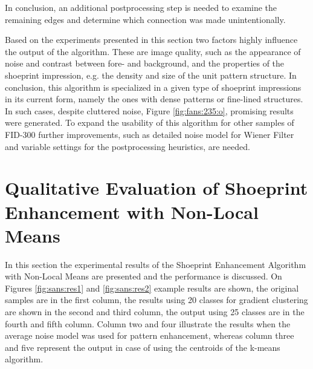 \documentclass[draft,final]{vutinfth} %
\begin{document}
In conclusion, an additional postprocessing step is needed to examine the remaining edges and determine which connection was made unintentionally.
\par
Based on the experiments presented in this section two factors highly influence the output of the algorithm.
These are image quality, such as the appearance of noise and contrast between fore- and background, and the properties of the shoeprint impression, e.g. the density and size of the unit pattern structure.
In conclusion, this algorithm is specialized in a given type of shoeprint impressions in its current form, namely the ones with dense patterns or fine-lined structures. 
In such cases, despite cluttered noise, Figure \ref{fig:fans:235:o}, promising results were generated.
To expand the usability of this algorithm for other samples of FID-300 further improvements, such as detailed noise model for Wiener Filter and variable settings for the postprocessing heuristics, are needed. 

\section{Qualitative Evaluation of Shoeprint Enhancement with Non-Local Means}
\par
In this section the experimental results of the Shoeprint Enhancement Algorithm with Non-Local Means are presented and the performance is discussed.
On Figures \ref{fig:sans:res1} and \ref{fig:sans:res2} example results are shown, the original samples are in the first column, the results using 20 classes for gradient clustering are shown in the second and third column, the output using 25 classes are in the fourth and fifth column.
Column two and four illustrate the results when the average noise model was used for pattern enhancement, whereas column three and five represent the output in case of using the centroids of the k-means algorithm.
\end{document}
